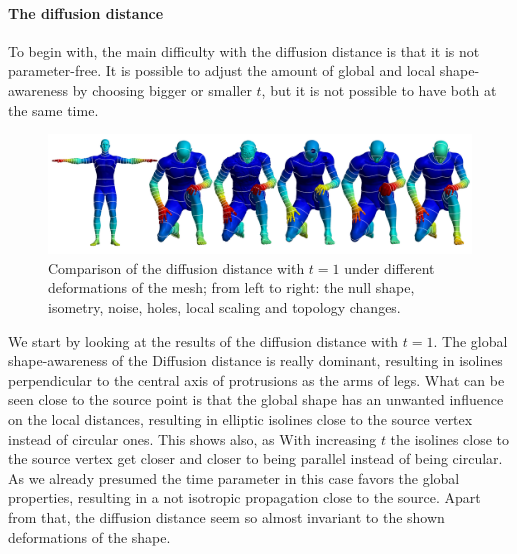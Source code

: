 \paragraph{The diffusion distance}
To begin with, the main difficulty with the diffusion distance is that it is not parameter-free.
It is possible to adjust the amount of global and local shape-awareness by choosing bigger or smaller $t$, but it is not possible to have both at the same time.
\begin{figure}[h]
	\centering
	\includegraphics[width = \textwidth]{../results/diffusion_big_isolines}
	\caption{Comparison of the diffusion distance with $t = 1$ under different deformations of the mesh; from left to right: the null shape, isometry, noise, holes, local scaling and topology changes.}
	\label{fig:diffusion_b_isolines}
\end{figure}
We start by looking at the results of the diffusion distance with $t=1$.
The global shape-awareness of the Diffusion distance is really dominant, resulting in isolines perpendicular to the central axis of protrusions as the arms of legs.
What can be seen close to the source point is that the global shape has an unwanted influence on the local distances, resulting in elliptic isolines close to the source vertex instead of circular ones.
This shows also, as With increasing $t$ the isolines close to the source vertex get closer and closer to being parallel instead of being circular.
As we already presumed the time parameter in this case favors the global properties, resulting in a not isotropic propagation close to the source.
Apart from that, the diffusion distance seem so almost invariant to the shown deformations of the shape.

